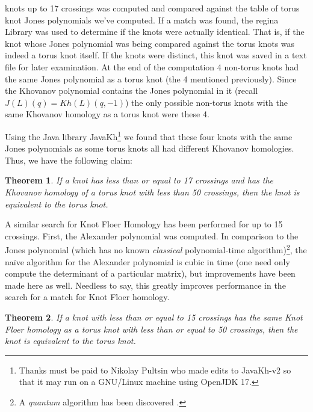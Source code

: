 \documentclass{article}
\theoremstyle{plain}
\newtheorem{theorem}{Theorem}
\begin{document}
	    knots up to 17 crossings was computed and compared against the table of
	    torus knot Jones polynomials we've computed. If a match was found,
	    the regina Library was used to determine if the knots were actually
	    identical. That is, if the knot whose Jones polynomial was being
	    compared against the torus knots was indeed a torus knot itself. If the
	    knots were distinct, this knot was saved in a text file for later
	    examination. At the end of the computation 4 non-torus knots had the
	    same Jones polynomial as a torus knot (the 4 mentioned previously).
	    Since the Khovanov polynomial contains the Jones polynomial in it
	    (recall $J(L)(q)=Kh(L)(q,-1)$) the only possible non-torus knots with
	    the same Khovanov homology as a torus knot were these 4.
	    \par\hfill\par
        Using the Java library JavaKh\footnote{%
            Thanks must be paid to Nikolay Pultsin who made edits to
            JavaKh-v2 so that it may run on a GNU/Linux machine using
            OpenJDK 17.
        }
        we found that these four knots with the same Jones polynomials as some
        torus knots all had different Khovanov homologies. Thus, we have the
        following claim:
        \begin{theorem}
            If a knot has less than or equal to 17 crossings and has the
            Khovanov homology of a torus knot with less than 50 crossings, then
            the knot is equivalent to the torus knot.
        \end{theorem}
        A similar search for Knot Floer Homology has been performed for up to 15
        crossings. First, the Alexander polynomial was computed.
        In comparison to the Jones polynomial (which has no known
        \textit{classical} polynomial-time algorithm)\footnote{%
            A \textit{quantum} algorithm has been discovered
            \cite{JonesQuantumAlgorithm}.
        }, the na\"{i}ve algorithm for the Alexander polynomial is cubic in
        time (one need only compute the determinant of a particular matrix), but
        improvements have been made here as well. Needless to say, this greatly
        improves performance in the search for a match for Knot Floer homology.
        \begin{theorem}
            If a knot with less than or equal to 15 crossings has the same
            Knot Floer homology as a torus knot with less than or equal to 50
            crossings, then the knot is equivalent to the torus knot.
        \end{theorem}
\end{document}
